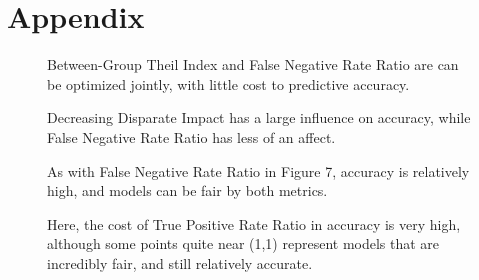 \documentclass{elsarticle}
\newcommand{\figures}[4]{
	\begin{figure}[H]{
		\centering{
			\texttt{[image: \#1]}
		}
		\caption{#2}
		}
	\end{figure}
	\begin{figure}[H] {
		\centering{
			\texttt{[image: \#3]}
		}
		\caption{#4}
	}
	\end{figure}
}
\begin{document}




\section{Appendix}
\figures{FNR Ratio|Between-Group Theil Index|COMPAS.png}{ Between-Group Theil Index and False Negative Rate Ratio are can be optimized jointly, with little cost to predictive accuracy.}{FNR Ratio|Disparate Impact|COMPAS.png}{Decreasing Disparate Impact has a large influence on accuracy, while False Negative Rate Ratio has less of an affect.}

\figures{TPR Ratio|Between-Group Theil Index|COMPAS.png}{As with False Negative Rate Ratio in Figure 7, accuracy is relatively high, and models can be fair by both metrics.}{TPR Ratio|FNR Ratio|COMPAS.png}{Here, the cost of True Positive Rate Ratio in accuracy is very high, although some points quite near (1,1) represent models that are incredibly fair, and still relatively accurate.}
\end{document}
